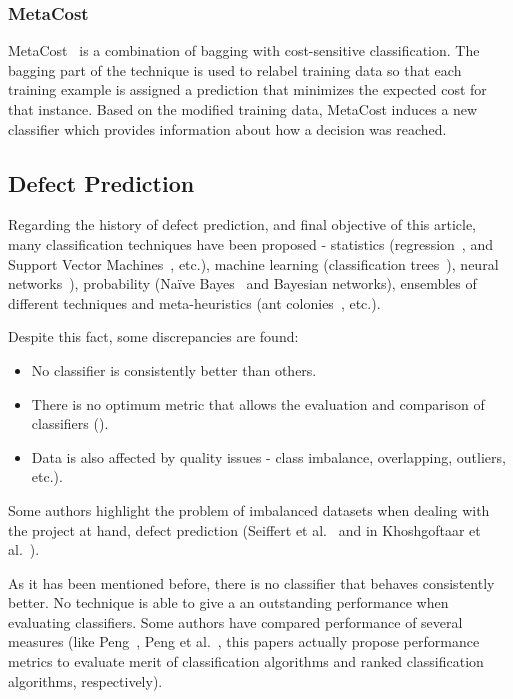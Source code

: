 \subsubsection{MetaCost}

MetaCost~\cite{Domingos1999} is a combination of bagging with cost-sensitive 
classification. The bagging part of the technique is used to relabel training 
data so that each training example is assigned a prediction that minimizes the 
expected cost for that instance. Based on the modified training data, MetaCost 
induces a new classifier which provides information about how a decision was 
reached.

\subsection{Defect Prediction}\label{subsec:defectPrediction}

Regarding the history of defect prediction, and final objective of this 
article, many classification techniques have been proposed - statistics
(regression~\cite{Bibi06}, and Support Vector Machines~\cite{Elish2008}, etc.),
machine learning (classification trees~\cite{Khoshgoftaar02}), neural 
networks~\cite{Khoshgoftaar97}), probability (Na\"ive Bayes~\cite{Menzies07b} 
and Bayesian networks), ensembles of different techniques and meta-heuristics
(ant colonies~\cite{Vandecruys2008}, etc.).

Despite this fact, some discrepancies are found:

\begin{itemize}
    \item No classifier is consistently better than others.
    \item There is no optimum metric that allows the evaluation and comparison
    of classifiers (\cite{Mende09,Zhang07,Menzies07b}).
    \item Data is also affected by quality issues - class imbalance, 
    overlapping, outliers, etc.).
\end{itemize}

Some authors highlight the problem of imbalanced datasets when dealing with
the project at hand, defect prediction (Seiffert et al.~\cite{Seiffert2009} and 
in Khoshgoftaar et al.~\cite{Khoshgoftaar03}).

As it has been mentioned before, there is no classifier that behaves 
consistently better. No technique is able to give a an outstanding performance 
when evaluating classifiers. Some authors have compared performance of several
measures (like Peng~\cite{Peng2009}, Peng et al.~\cite{Peng2010}, this papers
actually propose performance metrics to evaluate merit of classification 
algorithms and ranked classification algorithms, respectively).

